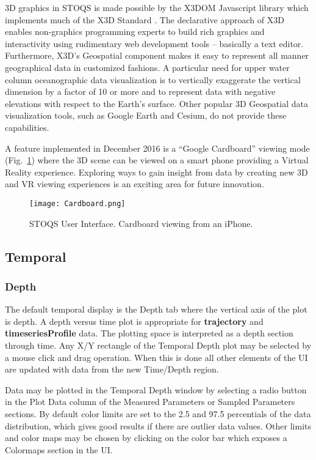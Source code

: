 \documentclass[conference]{IEEEtran}
\begin{document}
3D graphics in STOQS is made possible by the X3DOM Javascript library \cite{Behr:2010:SAH:1836049.1836077} 
which implements much of the X3D Standard \cite{x3d07}. The declarative approach of X3D
enables non-graphics programming experts to build rich graphics and interactivity 
using rudimentary web development tools -- basically a text editor. Furthermore, X3D's Geospatial component
\cite{Plesch:2015:XGC:2775292.2775315}
makes it easy to represent all manner geographical data in customized fashions. 
A particular need for upper water column oceanographic data visualization is to
vertically exaggerate the vertical dimension by a factor of 10 or more and to
represent data with negative elevations with respect to the Earth's surface.
Other popular 3D Geospatial data visualization tools, such as Google Earth 
and Cesium, do not provide these capabilities.

A feature implemented in December 2016 is a ``Google Cardboard'' viewing mode
(Fig.~\ref{fig:Cardboard}) where the 3D scene can be viewed on a smart phone providing a Virtual 
Reality experience. Exploring ways to gain insight from data by creating new
3D and VR viewing experiences is an exciting area for future innovation.

\begin{figure}[htbp]
\centering
\texttt{[image: Cardboard.png]}
\caption{STOQS User Interface. Cardboard viewing from an iPhone.}
\label{fig:Cardboard}
\end{figure}

\subsection{Temporal}

\subsubsection{Depth}
The default temporal display is the Depth tab where the vertical axis of the plot 
is depth. A depth versus time plot is appropriate for \textbf{trajectory} and 
\textbf{timeseriesProfile} data. The plotting space is interpreted as a 
depth section through time. Any X/Y rectangle of the Temporal 
Depth plot may be selected by a mouse click and drag operation. 
When this is done all other elements of the UI are updated with data 
from the new Time/Depth region.

Data may be plotted in the Temporal Depth window by selecting a radio button
in the Plot Data column of the Measured Parameters or Sampled Parameters sections.
By default color limits are set to the 2.5 and 97.5 percentials of the data distribution,
which gives good results if there are outlier data values. Other limits and
color maps may be chosen by clicking on the color bar which exposes a Colormaps section in the UI.
\end{document}
